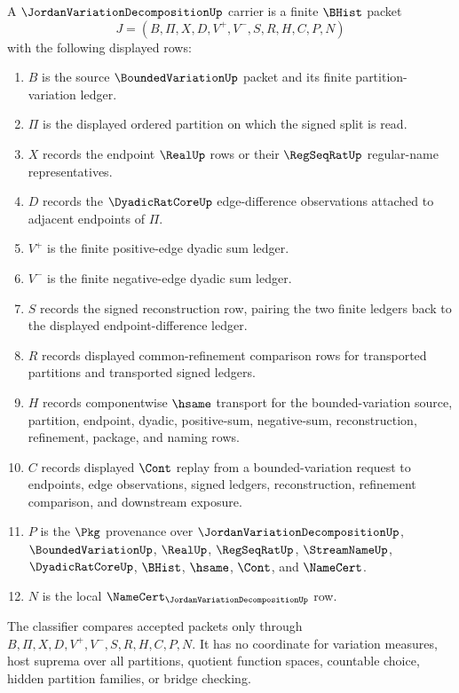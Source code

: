 \begin{definition}
\label{def:jordan-variation-decomposition-carrier}
A $\JordanVariationDecompositionUp$ carrier is a finite $\BHist$ packet
$$
J=(B,\Pi,X,D,V^{+},V^{-},S,R,H,C,P,N)
$$
with the following displayed rows:
\begin{enumerate}
\item $B$ is the source $\BoundedVariationUp$ packet and its finite partition-variation ledger.
\item $\Pi$ is the displayed ordered partition on which the signed split is read.
\item $X$ records the endpoint $\RealUp$ rows or their $\RegSeqRatUp$ regular-name representatives.
\item $D$ records the $\DyadicRatCoreUp$ edge-difference observations attached to adjacent endpoints of $\Pi$.
\item $V^{+}$ is the finite positive-edge dyadic sum ledger.
\item $V^{-}$ is the finite negative-edge dyadic sum ledger.
\item $S$ records the signed reconstruction row, pairing the two finite ledgers back to the displayed endpoint-difference ledger.
\item $R$ records displayed common-refinement comparison rows for transported partitions and transported signed ledgers.
\item $H$ records componentwise $\hsame$ transport for the bounded-variation source, partition, endpoint, dyadic, positive-sum, negative-sum, reconstruction, refinement, package, and naming rows.
\item $C$ records displayed $\Cont$ replay from a bounded-variation request to endpoints, edge observations, signed ledgers, reconstruction, refinement comparison, and downstream exposure.
\item $P$ is the $\Pkg$ provenance over $\JordanVariationDecompositionUp$, $\BoundedVariationUp$, $\RealUp$, $\RegSeqRatUp$, $\StreamNameUp$, $\DyadicRatCoreUp$, $\BHist$, $\hsame$, $\Cont$, and $\NameCert$.
\item $N$ is the local $\NameCert_{\JordanVariationDecompositionUp}$ row.
\end{enumerate}
The classifier compares accepted packets only through $B,\Pi,X,D,V^{+},V^{-},S,R,H,C,P,N$. It has no coordinate for variation measures, host suprema over all partitions, quotient function spaces, countable choice, hidden partition families, or bridge checking.
\end{definition}

